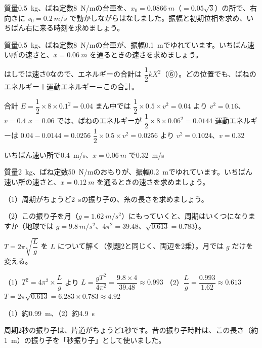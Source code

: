 \begin{jibun}
質量\qty{0.5}{kg}、ばね定数\qty{8}{N/m}の台車を、$x_0=\qty{0.0866}{m}$（$=0.05\sqrt3$）の所で、右向きに $v_0=\qty{0.2}{m/s}$ で動かしながらはなしました。振幅と初期位相を求め、いちばん右に来る時刻を求めましょう。
\end{jibun}

\begin{reidai}[エネルギーから速さを求める]
質量\qty{0.5}{kg}、ばね定数\qty{8}{N/m}の台車が、振幅\qty{0.1}{m}でゆれています。いちばん速い所の速さと、$x=\qty{0.06}{m}$ を通るときの速さを求めましょう。\par
\kangaekata はしでは速さ0なので、エネルギーの合計は $\dfrac{1}{2}kX^2$（⑥）。どの位置でも、ばねのエネルギー＋運動エネルギー＝この合計。\par
\shiki
\kviga 合計 $E=\dfrac{1}{2}\times8\times0.1^2=0.04$
\kviga まん中では $\dfrac{1}{2}\times0.5\times v^2=0.04$ より $v^2=0.16$、$v=0.4$
\kviga $x=0.06$ では、ばねのエネルギーが $\dfrac{1}{2}\times8\times0.06^2=0.0144$
\kviga 運動エネルギーは $0.04-0.0144=0.0256$
\kviga $\dfrac{1}{2}\times0.5\times v^2=0.0256$ より $v^2=0.1024$、$v=0.32$\par
\kotae いちばん速い所で\qty{0.4}{m/s}、$x=\qty{0.06}{m}$ で\qty{0.32}{m/s}
\end{reidai}

\begin{jibun}
質量\qty{2}{kg}、ばね定数\qty{50}{N/m}のおもりが、振幅\qty{0.2}{m}でゆれています。いちばん速い所の速さと、$x=\qty{0.12}{m}$ を通るときの速さを求めましょう。
\end{jibun}

\begin{reidai}[振り子の長さと周期]
（1）周期がちょうど\qty{2}{s}の振り子の、糸の長さを求めましょう。\par
（2）この振り子を月（$g=\qty{1.62}{m/s^2}$）にもっていくと、周期はいくつになりますか（地球では $g=\qty{9.8}{m/s^2}$、$4\pi^2=39.48$、$\sqrt{0.613}=0.783$）。\par
\kangaekata $T=2\pi\sqrt{\dfrac{L}{g}}$ を $L$ について解く（例題2と同じく、両辺を2乗）。月では $g$ だけを変える。\par
\shiki
\kviga（1）$T^2=4\pi^2\times\dfrac{L}{g}$ より $L=\dfrac{gT^2}{4\pi^2}=\dfrac{9.8\times4}{39.48}\approx0.993$
\kviga（2）$\dfrac{L}{g}=\dfrac{0.993}{1.62}\approx0.613$
\kvigb $T=2\pi\sqrt{0.613}=6.283\times0.783\approx4.92$\par
\kotae （1）約\qty{0.99}{m}、（2）約\qty{4.9}{s}
\end{reidai}
周期2秒の振り子は、片道がちょうど1秒です。昔の振り子時計は、この長さ（約\qty{1}{m}）の振り子を「秒振り子」として使いました。


